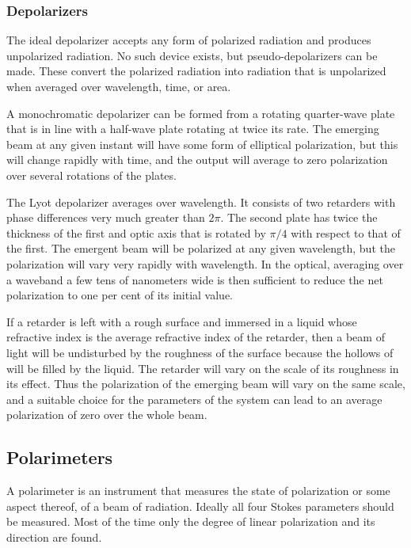 \subsubsection{Depolarizers}

The ideal depolarizer accepts any form of polarized radiation and produces unpolarized
radiation. No such device exists, but pseudo-depolarizers can be made. These convert the polarized radiation into radiation that is unpolarized when averaged over wavelength, time, or area. 

A monochromatic depolarizer can be formed from a rotating quarter-wave plate that is in
line with a half-wave plate rotating at twice its rate. The emerging beam at any given instant will have some form of elliptical polarization, but this will change rapidly with time, and the output will average to zero polarization over several rotations of the plates. 

The Lyot depolarizer averages over wavelength. It consists of two retarders with phase differences very much greater than $2\pi$. The second plate has twice the thickness of the first and optic axis that is rotated by $\pi/4$ with respect to that of the first. The emergent beam will be polarized at any given wavelength, but the polarization will vary very rapidly with wavelength. In the optical, averaging over a waveband a few tens of nanometers wide is then sufficient to reduce the net polarization to one per cent of its initial value. 

If a retarder is left with a rough surface and immersed in a liquid whose refractive index is the average refractive index of the retarder, then a beam of light will be undisturbed by the roughness of the surface because the hollows of will be filled by the liquid. The retarder will vary on the scale of its roughness in its effect. Thus the polarization of the emerging beam will vary on the same scale, and a suitable choice for the parameters of the system can lead to an average polarization of zero over the whole beam.

\subsection{Polarimeters}

A polarimeter is an instrument that measures the state of polarization or some aspect thereof, of a beam of radiation. Ideally all four Stokes parameters should be measured. Most of the time only the degree of linear polarization and its direction are found.

